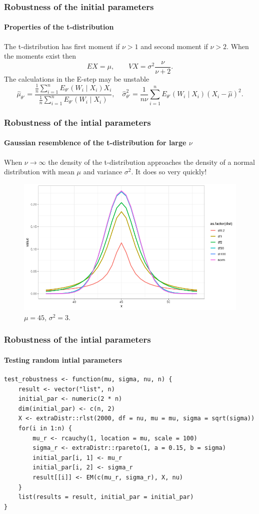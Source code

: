 \documentclass[aspectratio=169]{beamer}
\begin{document}
\begin{frame}
    \frametitle{Robustness of the initial parameters}
    \framesubtitle{Properties of the t-distribution}
    The t-distribution has first moment if $\nu > 1$ and second moment if $\nu > 2$. When the moments exist then
    \begin{equation}
        EX = \mu,\quad\quad VX = \sigma^{2}\frac{\nu}{\nu + 2}.
    \end{equation}
    The calculations in the E-step may be unstable
    \begin{equation*}
        \hat\mu_{\theta'} =\frac{\frac{1}{n}\sum_{i=1}^{n}E_{\theta'}(W_{i}\mid X_{i})X_{i}}{\frac{1}{n}\sum_{i=1}^{n}E_{\theta'}(W_{i}\mid X_{i})},\quad \hat\sigma^{2}_{\theta'}= \frac{1}{n\nu}\sum_{i=1}^{n}E_{\theta'}(W_{i}\mid X_{i})(X_{i}-\hat\mu)^{2}.
    \end{equation*}
\end{frame}

\begin{frame}[fragile]
    \frametitle{Robustness of the intial parameters}
    \framesubtitle{Gaussian resemblence of the t-distribution for large $\nu$}
    When $\nu\longrightarrow\infty$ the density of the t-distribution approaches the density of a normal distribution with mean $\mu$ and variance $\sigma^{2}$. It does so very quickly!
    \begin{figure}
        \centering
        \includegraphics[scale=0.35]{pictures/densities.png}
        \caption{$\mu = 45$, $\sigma^{2}= 3$.}
    \end{figure}
\end{frame}

\begin{frame}[fragile]
    \frametitle{Robustness of the intial parameters}
    \framesubtitle{Testing random intial parameters}
\begin{verbatim}
test_robustness <- function(mu, sigma, nu, n) {
    result <- vector("list", n)
    initial_par <- numeric(2 * n)
    dim(initial_par) <- c(n, 2)
    X <- extraDistr::rlst(2000, df = nu, mu = mu, sigma = sqrt(sigma))
    for(i in 1:n) {
        mu_r <- rcauchy(1, location = mu, scale = 100)
        sigma_r <- extraDistr::rpareto(1, a = 0.15, b = sigma)
        initial_par[i, 1] <- mu_r
        initial_par[i, 2] <- sigma_r
        result[[i]] <- EM(c(mu_r, sigma_r), X, nu)
    }
    list(results = result, initial_par = initial_par)
}
\end{verbatim}
\end{frame}
\end{document}
